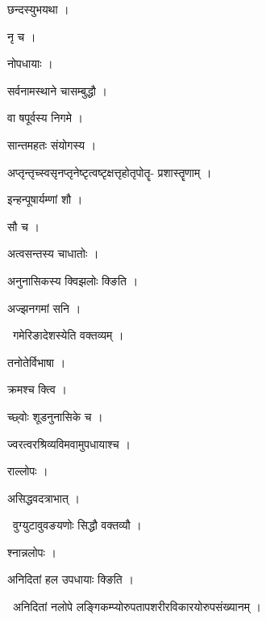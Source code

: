 \documentclass[10pt, openany, oneside]{book}
\begin{document}
\noindent छन्दस्युभयथा ।

\noindent नृ च ।

\noindent नोपधायाः ।

\noindent सर्वनामस्थाने चासम्बुद्धौ ।

\noindent वा षपूर्वस्य निगमे ।

\noindent सान्तमहतः संयोगस्य ।

\noindent अप्तृन्तृच्स्वसृनप्तृनेष्टृत्वष्टृक्षत्तृहोतृपोतॄ- प्रशास्तॄणाम् ।

\noindent इन्हन्पूषार्यम्णां शौ ।

\noindent सौ च ।

\noindent अत्वसन्तस्य चाधातोः ।

\noindent अनुनासिकस्य क्विझलोः क्ङिति ।

\noindent अज्झनगमां सनि ।

\par\noindent\hspace{1.5em}{\vps वा॰}~{\qt गमेरिङादेशस्येति वक्तव्यम् ।}

\noindent तनोतेर्विभाषा ।

\noindent क्रमश्च क्त्वि ।

\noindent च्छ्वोः शूडनुनासिके च ।

\noindent ज्वरत्वरश्रिव्यविमवामुपधायाश्च ।

\noindent राल्लोपः ।

\noindent असिद्धवदत्राभात् ।

\par\noindent\hspace{1.5em}{\vps वा॰}~{\qt वुग्युटावुवङयणोः सिद्धौ वक्तव्यौ ।}

\noindent श्नान्नलोपः ।

\noindent अनिदितां हल उपधायाः क्ङिति ।

\par\noindent\hspace{1.5em}{\vps वा॰}~{\qt अनिदितां नलोपे लङ्गिकम्प्योरुपतापशरीरविकारयोरुपसंख्यानम् ।}
\end{document}
